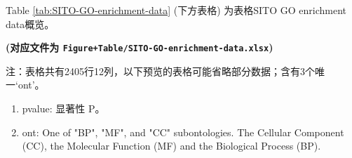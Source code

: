 \documentclass[
]{article}
\providecommand{\tightlist}{%
  \setlength{\itemsep}{0pt}\setlength{\parskip}{0pt}}
\begin{document}
\begin{center}\vspace{1.5cm}\end{center}

\begin{center}\vspace{1.5cm}\end{center}

Table \ref{tab:SITO-GO-enrichment-data} (下方表格) 为表格SITO GO enrichment data概览。

\textbf{(对应文件为 \texttt{Figure+Table/SITO-GO-enrichment-data.xlsx})}

\begin{center}\begin{tcolorbox}[colback=gray!10, colframe=gray!50, width=0.9\linewidth, arc=1mm, boxrule=0.5pt]注：表格共有2405行12列，以下预览的表格可能省略部分数据；含有3个唯一`ont'。
\end{tcolorbox}
\end{center}
\begin{center}\begin{tcolorbox}[colback=gray!10, colframe=gray!50, width=0.9\linewidth, arc=1mm, boxrule=0.5pt]\begin{enumerate}\tightlist
\item pvalue:  显著性 P。
\item ont:  One of "BP", "MF", and "CC" subontologies. The Cellular Component (CC), the Molecular Function (MF) and the Biological Process (BP).
\end{enumerate}\end{tcolorbox}
\end{center}
\end{document}
